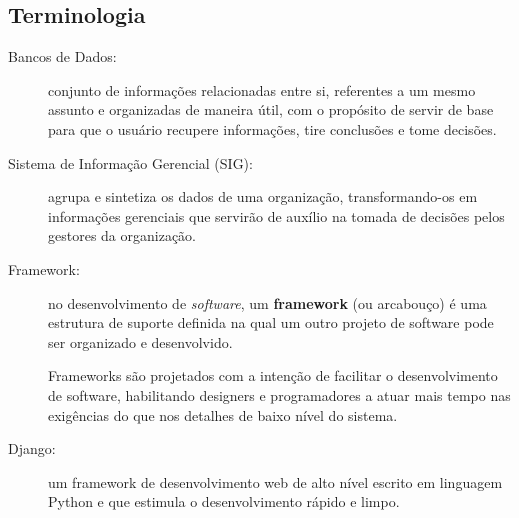 \subsection{Terminologia}
\begin{description}
\item[Bancos de Dados:] conjunto de informações relacionadas entre
  si, referentes a um mesmo assunto e organizadas de maneira útil, com
  o propósito de servir de base para que o usuário recupere
  informações, tire conclusões e tome decisões.
\item[Sistema de Informação Gerencial (SIG):] agrupa e sintetiza os
  dados de uma organização, transformando-os em informações gerenciais
  que servirão de auxílio na tomada de decisões pelos gestores da
  organização.
\item[Framework:] no desenvolvimento de \textit{software}, um
  \textbf{framework} (ou arcabouço) é uma estrutura de suporte
  definida na qual um outro projeto de software pode ser organizado e
  desenvolvido.

  Frameworks são projetados com a intenção de facilitar o
  desenvolvimento de software, habilitando designers e programadores a
  atuar mais tempo nas exigências do que nos detalhes de baixo nível
  do sistema.
\item[Django:] um framework de desenvolvimento web de alto nível
  escrito em linguagem Python e que estimula o desenvolvimento rápido
  e limpo.
\end{description}

%
%
